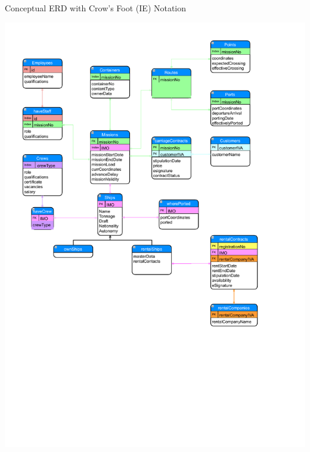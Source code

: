 \documentclass[10pt]{report}
\begin{document}
\begin{blockfigure}{Conceptual ERD with Crow's Foot (IE) Notation}
	\begin{center}
		\includegraphics[trim=0cm 8cm 0cm 1cm,clip=true, width=.6\textwidth]{mercantileShips-Conceptual.pdf}
	\end{center}
\end{blockfigure}
\end{document}
